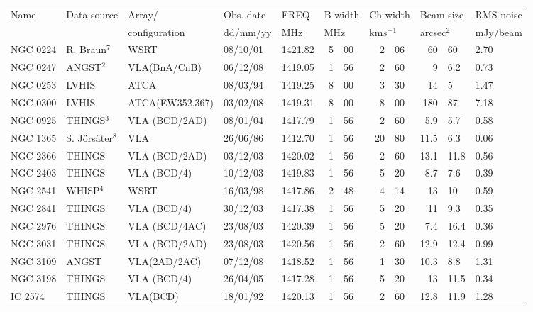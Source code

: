 \documentclass[usenatbib,useAMS]{mnras}
\begin{document}
\begin{table}
\begin{tabular}{lllllr@{.}lr@{.}lr@{$\times$}ll}

\hline
Name & Data source & Array/ & Obs. date & FREQ & \multicolumn{2}{l}{B-width} & \multicolumn{2}{l}{Ch-width} & \multicolumn{2}{l}{Beam size} & RMS noise\\
& & configuration & dd/mm/yy & MHz & \multicolumn{2}{l}{MHz} & \multicolumn{2}{l}{km$s^{-1}$} & \multicolumn{2}{l}{arcsec$^{2}$}& mJy/beam\\

\hline
NGC 0224 &R. Braun$^{7}$& WSRT           & 08/10/01 & 1421.82 &  5 & 00 & 2& 06 & 60&60	&2.70\\
NGC 0247 & ANGST$^{2}$  & VLA(BnA/CnB)   & 06/12/08 & 1419.05 &  1 & 56 & 2& 60 &  9&6.2	&0.73\\
NGC 0253 & LVHIS        & ATCA           & 08/03/94 & 1419.25 &  8 & 00 & 3& 30 & 14&5	&1.47\\
NGC 0300 & LVHIS        & ATCA(EW352,367)& 03/02/08 & 1419.31 &  8 & 00 & 8& 00 &180&87	&7.18\\
NGC 0925 & THINGS$^{3}$ & VLA (BCD/2AD)  & 08/01/04 & 1417.79 &  1 & 56 & 2& 60 &  5.9&5.7	&0.58\\
NGC 1365 & S. J\"{o}rs\"{a}ter$^{8}$ &VLA& 26/06/86 & 1412.70 &  1 & 56 &20& 80 & 11.5&6.3	&0.06\\
NGC 2366 & THINGS       & VLA (BCD/2AD)  & 03/12/03 & 1420.02 &  1 & 56 & 2& 60 & 13.1&11.8&0.56\\
NGC 2403 & THINGS       & VLA (BCD/4)    & 10/12/03 & 1419.83 &  1 & 56 & 5& 20 &  8.7&7.6	&0.39\\
NGC 2541 & WHISP$^{4}$  & WSRT           & 16/03/98 & 1417.86 &  2 & 48 & 4& 14 & 13&10&0.59\\
NGC 2841 & THINGS       & VLA (BCD/4)    & 30/12/03 & 1417.38 &  1 & 56 & 5& 20 & 11&9.3	&0.35\\
NGC 2976 & THINGS       & VLA (BCD/4AC)  & 23/08/03 & 1420.39 &  1 & 56 & 5& 20 &  7.4&16.4	&0.36\\
NGC 3031 & THINGS       & VLA (BCD/2AD)  & 23/08/03 & 1420.56 &  1 & 56 & 2& 60 & 12.9&12.4	&0.99\\
NGC 3109 & ANGST        & VLA(2AD/2AC)   & 07/12/08 & 1418.52 &  1 & 56 & 1& 30 & 10.3&8.8	&1.31\\
NGC 3198 & THINGS       & VLA (BCD/4)    & 26/04/05 & 1417.28 &  1 & 56 & 5& 20 & 13&11.5	&0.34\\
IC 2574	 & THINGS       & VLA(BCD)       & 18/01/92 & 1420.13 &  1 & 56 & 2& 60 & 12.8&11.9	&1.28\\

\end{tabular}
\end{table}
\end{document}
